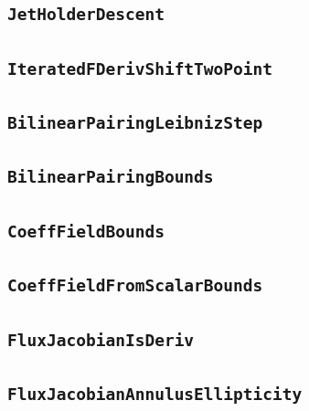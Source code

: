 \documentclass[11pt]{amsart}
\theoremstyle{definition}
\begin{document}
\subsection{\texorpdfstring{\texttt{JetHolderDescent}}{JetHolderDescent}}\label{node:JetHolderDescent}


\subsection{\texorpdfstring{\texttt{IteratedFDerivShiftTwoPoint}}{IteratedFDerivShiftTwoPoint}}\label{node:IteratedFDerivShiftTwoPoint}


\subsection{\texorpdfstring{\texttt{BilinearPairingLeibnizStep}}{BilinearPairingLeibnizStep}}\label{node:BilinearPairingLeibnizStep}


\subsection{\texorpdfstring{\texttt{BilinearPairingBounds}}{BilinearPairingBounds}}\label{node:BilinearPairingBounds}


\subsection{\texorpdfstring{\texttt{CoeffFieldBounds}}{CoeffFieldBounds}}\label{node:CoeffFieldBounds}


\subsection{\texorpdfstring{\texttt{CoeffFieldFromScalarBounds}}{CoeffFieldFromScalarBounds}}\label{node:CoeffFieldFromScalarBounds}


\subsection{\texorpdfstring{\texttt{FluxJacobianIsDeriv}}{FluxJacobianIsDeriv}}\label{node:FluxJacobianIsDeriv}


\subsection{\texorpdfstring{\texttt{FluxJacobianAnnulusEllipticity}}{FluxJacobianAnnulusEllipticity}}\label{node:FluxJacobianAnnulusEllipticity}

\end{document}
